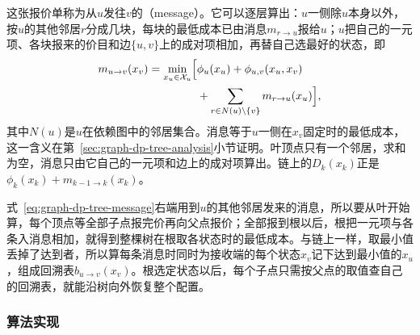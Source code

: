 这张报价单称为从$u$发往$v$的（message）。它可以逐层算出：$u$一侧除$u$本身以外，按$u$的其他邻居$r$分成几块，每块的最低成本已由消息$m_{r\to u}$报给$u$；$u$把自己的一元项、各块报来的价目和边$\{u,v\}$上的成对项相加，再替自己选最好的状态，即
\begin{equation}
\begin{aligned}
m_{u\to v}(x_v)=\min_{x_u\in\mathcal X_u}\Bigl[&\phi_u(x_u)+\phi_{u,v}(x_u,x_v)\\
&+\sum_{r\in N(u)\setminus\{v\}}m_{r\to u}(x_u)\Bigr],
\end{aligned}
\label{eq:graph-dp-tree-message}
\end{equation}
其中$N(u)$是$u$在依赖图中的邻居集合。消息等于$u$一侧在$x_v$固定时的最低成本，这一含义在第~\ref{sec:graph-dp-tree-analysis}小节证明。叶顶点只有一个邻居，求和为空，消息只由它自己的一元项和边上的成对项算出。链上的$D_k(x_k)$正是$\phi_k(x_k)+m_{k-1\to k}(x_k)$。

式~\eqref{eq:graph-dp-tree-message}右端用到$u$的其他邻居发来的消息，所以要从叶开始算，每个顶点等全部子点报完价再向父点报价；全部报到根以后，根把一元项与各条入消息相加，就得到整棵树在根取各状态时的最低成本。与链上一样，取最小值丢掉了达到者，所以算每条消息时同时为接收端的每个状态$x_v$记下达到最小值的$x_u$，组成回溯表$b_{u\to v}(x_v)$。根选定状态以后，每个子点只需按父点的取值查自己的回溯表，就能沿树向外恢复整个配置。

\subsubsection{算法实现}


